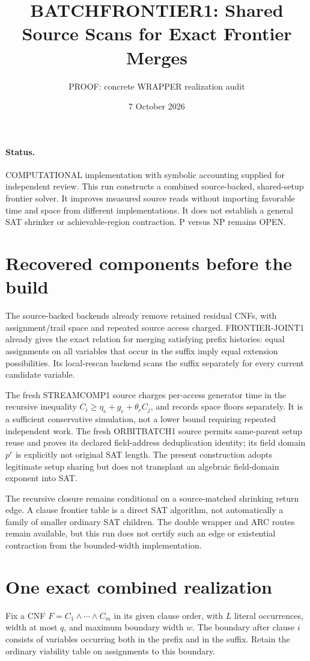 \documentclass[11pt]{article}
\title{BATCHFRONTIER1: Shared Source Scans for Exact Frontier Merges}
\author{PROOF: concrete WRAPPER realization audit}
\date{7 October 2026}
\begin{document}
\maketitle
\paragraph{Status.} COMPUTATIONAL implementation with symbolic accounting supplied for independent review. This run constructs a combined source-backed, shared-setup frontier solver. It improves measured source reads without importing favorable time and space from different implementations. It does not establish a general SAT shrinker or achievable-region contraction. P versus NP remains OPEN.

\section{Recovered components before the build}
The source-backed backends already remove retained residual CNFs, with assignment/trail space and repeated source access charged. FRONTIER-JOINT1 already gives the exact relation for merging satisfying prefix histories: equal assignments on all variables that occur in the suffix imply equal extension possibilities. Its local-rescan backend scans the suffix separately for every current candidate variable.

The fresh STREAMCOMP1 source charges per-access generator time in the recursive inequality $C_i\ge\eta_e+g_e+\theta_e C_j$, and records space floors separately. It is a sufficient conservative simulation, not a lower bound requiring repeated independent work. The fresh ORBITBATCH1 source permits same-parent setup reuse and proves its declared field-address deduplication identity; its field domain $p^r$ is explicitly not original SAT length. The present construction adopts legitimate setup sharing but does not transplant an algebraic field-domain exponent into SAT.

The recursive closure remains conditional on a source-matched shrinking return edge. A clause frontier table is a direct SAT algorithm, not automatically a family of smaller ordinary SAT children. The double wrapper and ARC routes remain available, but this run does not certify such an edge or existential contraction from the bounded-width implementation.

\section{One exact combined realization}
Fix a CNF $F=C_1\land\cdots\land C_m$ in its given clause order, with $L$ literal occurrences, width at most $q$, and maximum boundary width $w$. The boundary after clause $i$ consists of variables occurring both in the prefix and in the suffix. Retain the ordinary viability table on assignments to this boundary.
\end{document}
